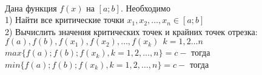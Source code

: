 \\
Дана функция $f(x)$ на $[a;b]$. Необходимо\\
1) Найти все критические точки $x_1, x_2, \ldots, x_n \in [a; b]$\\
2) Вычислить значения критических точек и крайних точек отрезка:\\
$f(a), f(b), f(x_1), f(x_2), \ldots, f(x_k) ~~ k = 1, 2 \ldots n$\\
$max \{f(a); f(b); f(x_k), k = 1, 2, \ldots, n\} = c - $ тогда \\
$min \{f(a); f(b); f(x_k), k = 1, 2, \ldots, n\} = c - $ тогда \\